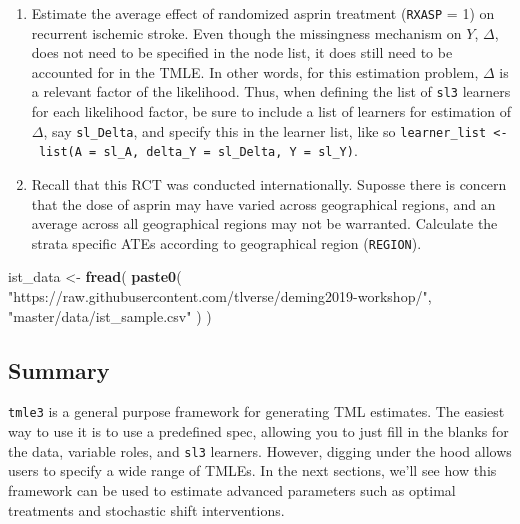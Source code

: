 \documentclass[12pt, krantz2,]{krantz}
\newenvironment{Shaded}{\begin{snugshade}}{\end{snugshade}}
\newcommand{\KeywordTok}[1]{\textcolor[rgb]{0.27,0.27,0.27}{\textbf{#1}}}
\newcommand{\NormalTok}[1]{#1}
\newcommand{\StringTok}[1]{\textcolor[rgb]{0.5,0.5,0.5}{#1}}
\providecommand{\tightlist}{%
  \setlength{\itemsep}{0pt}\setlength{\parskip}{0pt}}
\theoremstyle{definition}
\theoremstyle{definition}
\theoremstyle{definition}
\newcommand{\1}{\mathbbm{1}}
\begin{document}
\begin{enumerate}
\def\labelenumi{\arabic{enumi}.}
\tightlist
\item
  Estimate the average effect of randomized asprin treatment (\texttt{RXASP} = 1) on
  recurrent ischemic stroke. Even though the missingness mechanism on \(Y\),
  \(\Delta\), does not need to be specified in the node list, it does still need
  to be accounted for in the TMLE. In other words, for this estimation problem,
  \(\Delta\) is a relevant factor of the likelihood. Thus, when defining the
  list of \texttt{sl3} learners for each likelihood factor, be sure to include a list
  of learners for estimation of \(\Delta\), say \texttt{sl\_Delta}, and specify this in
  the learner list, like so
  \texttt{learner\_list\ \textless{}-\ list(A\ =\ sl\_A,\ delta\_Y\ =\ sl\_Delta,\ Y\ =\ sl\_Y)}.
\item
  Recall that this RCT was conducted internationally. Suposse there is concern
  that the dose of asprin may have varied across geographical regions, and an
  average across all geographical regions may not be warranted. Calculate the
  strata specific ATEs according to geographical region (\texttt{REGION}).
\end{enumerate}

\begin{Shaded}
\begin{Highlighting}[]
\NormalTok{ist_data <-}\StringTok{ }\KeywordTok{fread}\NormalTok{(}
  \KeywordTok{paste0}\NormalTok{(}
    \StringTok{"https://raw.githubusercontent.com/tlverse/deming2019-workshop/"}\NormalTok{,}
    \StringTok{"master/data/ist_sample.csv"}
\NormalTok{  )}
\NormalTok{)}
\end{Highlighting}
\end{Shaded}

\hypertarget{summary}{%
\subsection{Summary}\label{summary}}

\texttt{tmle3} is a general purpose framework for generating TML estimates. The easiest
way to use it is to use a predefined spec, allowing you to just fill in the
blanks for the data, variable roles, and \texttt{sl3} learners. However, digging under
the hood allows users to specify a wide range of TMLEs. In the next sections,
we'll see how this framework can be used to estimate advanced parameters such as
optimal treatments and stochastic shift interventions.
\end{document}
